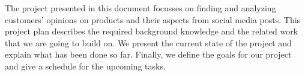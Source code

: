 The project presented in this document focusses on finding and analyzing customers' opinions on products and their aspects from social media posts. This project plan describes the required background knowledge and the related work that we are going to build on. We present the current state of the project and explain what has been done so far. Finally, we define the goals for our project and give a schedule for the upcoming tasks.